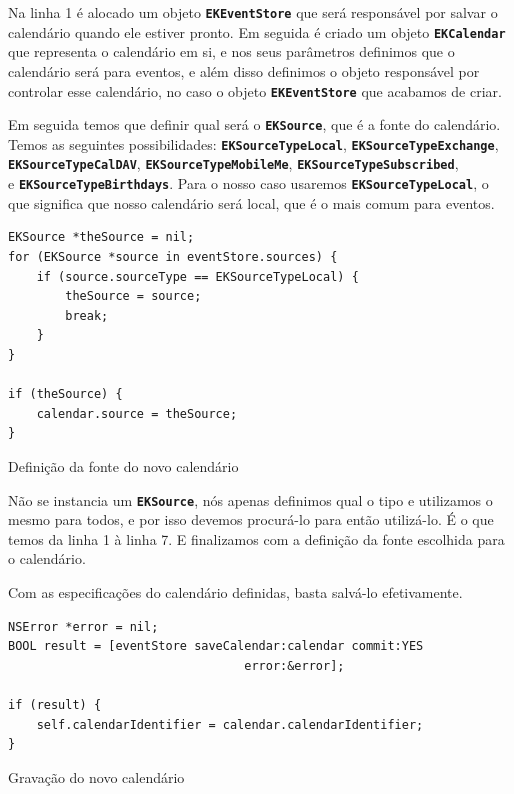 \documentclass[a4paper,12pt,brazil,doubleside]{book}
\begin{document}
\begin{singlespace}
Na linha 1 é alocado um objeto \texttt{\textbf{EKEventStore}} que será responsável por salvar o calendário quando ele estiver pronto. Em seguida é criado um objeto \texttt{\textbf{EKCalendar}} que representa o calendário em si, e nos seus parâmetros definimos que o calendário será para eventos, e além disso definimos o objeto responsável por controlar esse calendário, no caso o objeto \texttt{\textbf{EKEventStore}} que acabamos de criar.

Em seguida temos que definir qual será o \texttt{\textbf{EKSource}}, que é a fonte do calendário. Temos as seguintes possibilidades: \texttt{\textbf{EKSourceTypeLocal}}, \texttt{\textbf{EKSourceTypeExchange}},\\ \texttt{\textbf{EKSourceTypeCalDAV}}, \texttt{\textbf{EKSourceTypeMobileMe}}, \texttt{\textbf{EKSourceTypeSubscribed}},\\ e \texttt{\textbf{EKSourceTypeBirthdays}}. Para o nosso caso usaremos \texttt{\textbf{EKSourceTypeLocal}}, o que significa que nosso calendário será local, que é o mais comum para eventos.

\begin{listing}[H]
\begin{verbatim}
EKSource *theSource = nil;
for (EKSource *source in eventStore.sources) {
    if (source.sourceType == EKSourceTypeLocal) {
        theSource = source;
        break;
    }
}
    
if (theSource) {
    calendar.source = theSource;
}
\end{verbatim}
\caption{Definição da fonte do novo calendário}
\end{listing}


Não se instancia um \texttt{\textbf{EKSource}}, nós apenas definimos qual o tipo e utilizamos o mesmo para todos, e por isso devemos procurá-lo para então utilizá-lo. É o que temos da linha 1 à linha 7. E finalizamos com a definição da fonte escolhida para o calendário.

Com as especificações do calendário definidas, basta salvá-lo efetivamente.

\begin{listing}[H]
\begin{verbatim}
NSError *error = nil;
BOOL result = [eventStore saveCalendar:calendar commit:YES
                                 error:&error];

if (result) {
	self.calendarIdentifier = calendar.calendarIdentifier;
}
\end{verbatim}
\caption{Gravação do novo calendário}
\end{listing}



\end{singlespace}
\end{document}
